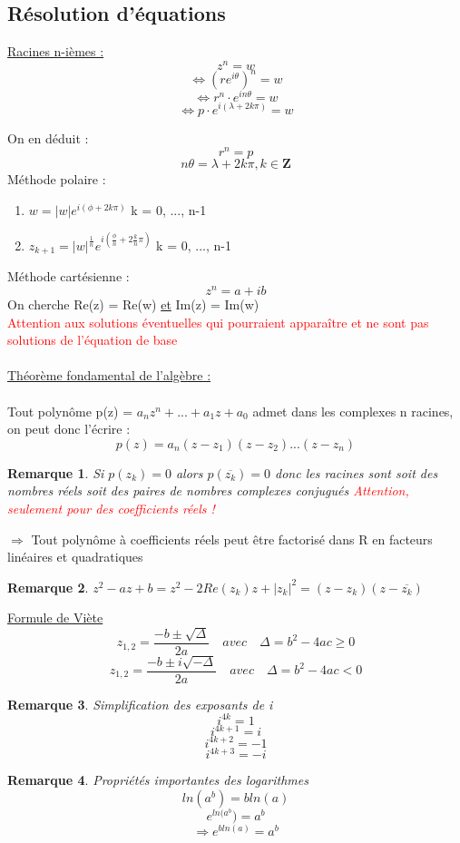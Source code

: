 \documentclass{article}
\newtheorem{remark}{Remarque}[section]
\begin{document}
\subsection{Résolution d'équations}
\underline{Racines n-ièmes :}
\[ z^n = w\]
\[ \Leftrightarrow {(re^{i\theta})}^n = w\]
\[ \Leftrightarrow r^n \cdot e^{in\theta} = w\]
\[ \Leftrightarrow p \cdot e^{i(\lambda + 2k\pi)} = w\]

On en déduit :
\[ r^n = p \]
\[ n\theta = \lambda + 2k\pi, k \in \mathbf{Z} \]
Méthode polaire :
\begin{enumerate}
    \item \( w = |w|e^{i(\phi + 2k\pi)} \) \qquad \qquad \qquad k = 0, ..., n-1
    \item \( z_{k+1} = |w|^{\frac{1}{n}}e^{i(\frac{\phi}{n} + 2\frac{k}{n}\pi)} \) \qquad \qquad \qquad k = 0, ..., n-1
\end{enumerate}
Méthode cartésienne :
\[ z^n = a + ib \]
On cherche Re(z) = Re(w) \underline{et} Im(z) = Im(w) \\
\textcolor{red}{Attention aux solutions éventuelles qui pourraient apparaître et ne sont pas solutions de l'équation de base}
\\\\
\underline{Théorème fondamental de l'algèbre :} \\\\
Tout polynôme p(z) = \( a_nz^n+...+a_1z +a_0 \) admet dans les complexes n racines, on peut donc l'écrire :
\[ p(z) = a_n(z - z_1)(z - z_2)...(z - z_n)\]
\begin{remark}
    Si \(p(z_k) = 0\) alors \(p(\overline{z_k}) = 0\) donc les racines sont soit des nombres réels soit des paires de nombres complexes conjugués \textcolor{red}{Attention, seulement pour des coefficients réels !}
\end{remark}
\(\Rightarrow\) Tout polynôme à coefficients réels peut être factorisé dans R en facteurs linéaires et quadratiques
\begin{remark}
    \( z^2 - az + b = z^2 - 2Re(z_k)z + |z_k|^2 = (z - z_k)(z - \overline{z_k})\)
\end{remark}
\underline{Formule de Viète}
\[ z_{1,2} = \frac{-b \pm \sqrt{\Delta}}{2a} \quad avec \quad \Delta = b^2 - 4ac \geq 0\]
\[ z_{1,2} = \frac{-b \pm i\sqrt{-\Delta}}{2a} \quad avec \quad \Delta = b^2 - 4ac < 0\]

\begin{remark}
Simplification des exposants de i
    \[ i^{4k} = 1 \]
    \[ i^{4k+1} = i \]
    \[ i^{4k+2} = -1 \] 
    \[ i^{4k+3} = -i \]
\end{remark}
\begin{remark}
Propriétés importantes des logarithmes
    \[ ln(a^{b}) = bln(a) \]
    \[ e^{ln(a^{b}}) = a^{b} \]
    \[ \Rightarrow e^{bln(a)} = a^{b} \]
\end{remark}
\end{document}
